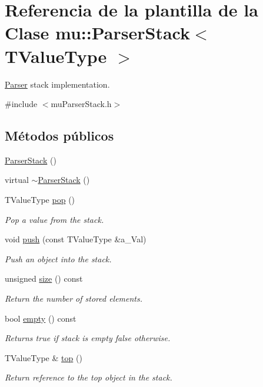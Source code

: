 \hypertarget{classmu_1_1_parser_stack}{}\section{Referencia de la plantilla de la Clase mu\+:\+:Parser\+Stack$<$ T\+Value\+Type $>$}
\label{classmu_1_1_parser_stack}


\hyperlink{classmu_1_1_parser}{Parser} stack implementation.  




{\ttfamily \#include $<$mu\+Parser\+Stack.\+h$>$}

\subsection*{Métodos públicos}
\begin{DoxyCompactItemize}
\item 
\hyperlink{classmu_1_1_parser_stack_a570cdffe52bdaf5c549446509f06ea96}{Parser\+Stack} ()
\item 
virtual \hyperlink{classmu_1_1_parser_stack_a7ac063affb6991bc6a06e111082a5cfb}{$\sim$\+Parser\+Stack} ()
\item 
T\+Value\+Type \hyperlink{classmu_1_1_parser_stack_ad00f833ee3f30d901fa18e714105c381}{pop} ()
\begin{DoxyCompactList}\small\item\em Pop a value from the stack. \end{DoxyCompactList}\item 
void \hyperlink{classmu_1_1_parser_stack_a38ae431c967a6607aace9dfd4ae4cc5f}{push} (const T\+Value\+Type \&a\+\_\+\+Val)
\begin{DoxyCompactList}\small\item\em Push an object into the stack. \end{DoxyCompactList}\item 
unsigned \hyperlink{classmu_1_1_parser_stack_a62c1e65a4e0d15f01a031fb245528166}{size} () const 
\begin{DoxyCompactList}\small\item\em Return the number of stored elements. \end{DoxyCompactList}\item 
bool \hyperlink{classmu_1_1_parser_stack_a43464a5bd94c2566b87cabe7d8e83fbb}{empty} () const 
\begin{DoxyCompactList}\small\item\em Returns true if stack is empty false otherwise. \end{DoxyCompactList}\item 
T\+Value\+Type \& \hyperlink{classmu_1_1_parser_stack_aba3a499ebaae388c27bfb81883cba7fd}{top} ()
\begin{DoxyCompactList}\small\item\em Return reference to the top object in the stack. \end{DoxyCompactList}\end{DoxyCompactItemize}


